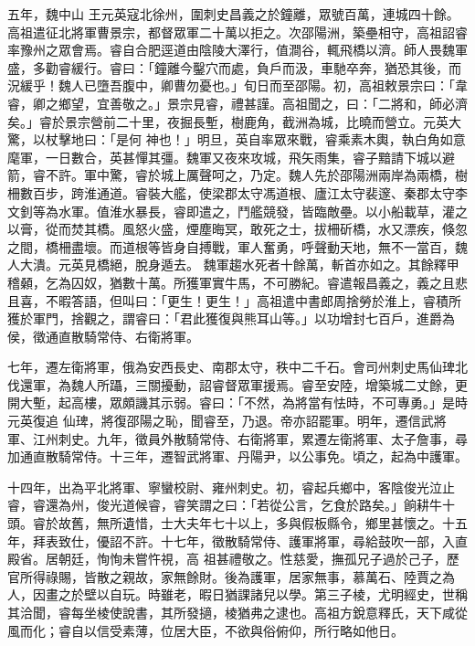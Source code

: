 \begin{pinyinscope}
 五年，魏中山
 王元英寇北徐州，圍刺史昌義之於鐘離，眾號百萬，連城四十餘。高祖遣征北將軍曹景宗，都督眾軍二十萬以拒之。次邵陽洲，築壘相守，高祖詔睿率豫州之眾會焉。睿自合肥逕道由陰陵大澤行，值澗谷，輒飛橋以濟。師人畏魏軍盛，多勸睿緩行。睿曰：「鐘離今鑿穴而處，負戶而汲，車馳卒奔，猶恐其後，而況緩乎！魏人已墮吾腹中，卿曹勿憂也。」旬日而至邵陽。初，高祖敕景宗曰：「韋睿，卿之鄉望，宜善敬之。」景宗見睿，禮甚謹。高祖聞之，曰：「二將和，師必濟矣。」睿於景宗營前二十里，夜掘長塹，樹鹿角，截洲為城，比曉而營立。元英大驚，以杖擊地曰：「是何
 神也！」明旦，英自率眾來戰，睿乘素木輿，執白角如意麾軍，一日數合，英甚憚其彊。魏軍又夜來攻城，飛矢雨集，睿子黯請下城以避箭，睿不許。軍中驚，睿於城上厲聲呵之，乃定。魏人先於邵陽洲兩岸為兩橋，樹柵數百步，跨淮通道。睿裝大艦，使梁郡太守馮道根、廬江太守裴邃、秦郡太守李文釗等為水軍。值淮水暴長，睿即遣之，鬥艦競發，皆臨敵壘。以小船載草，灌之以膏，從而焚其橋。風怒火盛，煙塵晦冥，敢死之士，拔柵斫橋，水又漂疾，倏忽之間，橋柵盡壞。而道根等皆身自搏戰，軍人奮勇，呼聲動天地，無不一當百，魏人大潰。元英見橋絕，脫身遁去。
 魏軍趨水死者十餘萬，斬首亦如之。其餘釋甲稽顙，乞為囚奴，猶數十萬。所獲軍實牛馬，不可勝紀。睿遣報昌義之，義之且悲且喜，不暇答語，但叫曰：「更生！更生！」高祖遣中書郎周捨勞於淮上，睿積所獲於軍門，捨觀之，謂睿曰：「君此獲復與熊耳山等。」以功增封七百戶，進爵為侯，徵通直散騎常侍、右衛將軍。



 七年，遷左衛將軍，俄為安西長史、南郡太守，秩中二千石。會司州刺史馬仙琕北伐還軍，為魏人所躡，三關擾動，詔睿督眾軍援焉。睿至安陸，增築城二丈餘，更開大塹，起高樓，眾頗譏其示弱。睿曰：「不然，為將當有怯時，不可專勇。」是時元英復追
 仙琕，將復邵陽之恥，聞睿至，乃退。帝亦詔罷軍。明年，遷信武將軍、江州刺史。九年，徵員外散騎常侍、右衛將軍，累遷左衛將軍、太子詹事，尋加通直散騎常侍。十三年，遷智武將軍、丹陽尹，以公事免。頃之，起為中護軍。



 十四年，出為平北將軍、寧蠻校尉、雍州刺史。初，睿起兵鄉中，客陰俊光泣止睿，睿還為州，俊光道候睿，睿笑謂之曰：「若從公言，乞食於路矣。」餉耕牛十頭。睿於故舊，無所遺惜，士大夫年七十以上，多與假板縣令，鄉里甚懷之。十五年，拜表致仕，優詔不許。十七年，徵散騎常侍、護軍將軍，尋給鼓吹一部，入直殿省。居朝廷，恂恂未嘗忤視，高
 祖甚禮敬之。性慈愛，撫孤兄子過於己子，歷官所得祿賜，皆散之親故，家無餘財。後為護軍，居家無事，慕萬石、陸賈之為人，因畫之於壁以自玩。時雖老，暇日猶課諸兒以學。第三子棱，尤明經史，世稱其洽聞，睿每坐棱使說書，其所發擿，棱猶弗之逮也。高祖方銳意釋氏，天下咸從風而化；睿自以信受素薄，位居大臣，不欲與俗俯仰，所行略如他日。




\end{pinyinscope}
